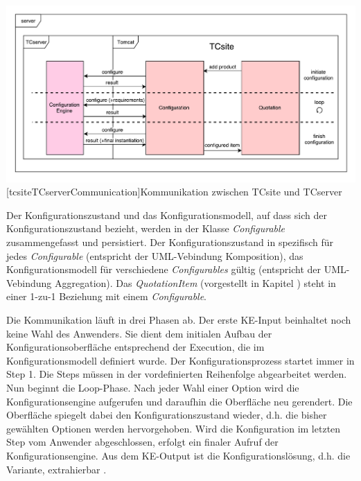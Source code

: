 \documentclass[11pt, a4paper, titlepage, listof=totoc, bibliography=totoc, index=totoc, twoside, openright, headings=normal]{scrreprt}
\begin{document}
\vspace{1em}
\begin{minipage}{\linewidth}
	\centering
	\includegraphics[width=1\linewidth]{Abbildungen/tcsiteTCserverCommunication.pdf}
	[tcsiteTCserverCommunication]{Kommunikation zwischen TCsite und TCserver}
	\label{fig:tcsiteTCserverCommunication}
\end{minipage}
\vspace{1em}

Der Konfigurationszustand und das Konfigurationsmodell, auf dass sich der Konfigurationszustand bezieht, werden in der Klasse \emph{Configurable} zusammengefasst und persistiert. Der Konfigurationszustand in spezifisch für jedes \emph{Configurable} (entspricht der UML-Vebindung \glqq Komposition\grqq), das Konfigurationsmodell für verschiedene \emph{Configurables} gültig (entspricht der UML-Vebindung \glqq Aggregation\grqq). Das \emph{QuotationItem} (vorgestellt in Kapitel  \label{subsubsection:tcsiteArchitektur}) steht in einer 1-zu-1 Beziehung mit einem \emph{Configurable}.

Die Kommunikation läuft in drei Phasen ab. Der erste KE-Input beinhaltet noch keine Wahl des Anwenders. Sie dient dem initialen Aufbau der Konfigurationsoberfläche entsprechend der Execution, die im Konfigurationsmodell definiert wurde. Der Konfigurationsprozess startet immer in Step 1. Die Steps müssen in der vordefinierten Reihenfolge abgearbeitet werden. Nun beginnt die Loop-Phase. Nach jeder Wahl einer Option wird die Konfigurationsengine aufgerufen und daraufhin die Oberfläche neu gerendert. Die Oberfläche spiegelt dabei den Konfigurationszustand wieder, d.h. die bisher gewählten Optionen werden hervorgehoben. Wird die Konfiguration im letzten Step vom Anwender abgeschlossen, erfolgt ein finaler Aufruf der Konfigurationsengine. Aus dem KE-Output ist die Konfigurationslösung, d.h. die Variante, extrahierbar \citep{tactonTCsiteDevelopmentManual}.
\end{document}
